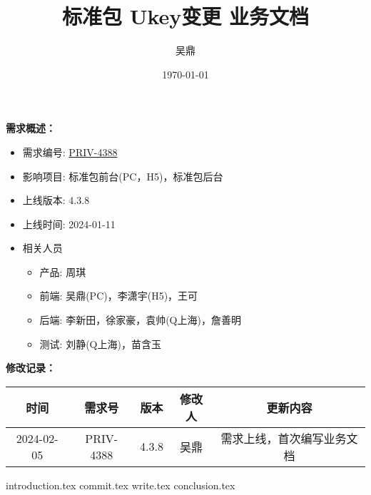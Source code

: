 \documentclass{../../latex/PionpillNote-article}
\title{\textbf{标准包 Ukey变更 业务文档}}
\author{
    吴鼎
}
\date{\today}
\begin{document}
\pagestyle{plain}
\maketitle

\noindent\textbf{需求概述：}

\begin{itemize}
    \item 需求编号: \href{https://jira.qiyuesuo.me/browse/PRIV-4388?goToView=1}{PRIV-4388}
    \item 影响项目: 标准包前台(PC，H5)，标准包后台
    \item 上线版本: 4.3.8
    \item 上线时间: 2024-01-11
    \item 相关人员
    \begin{itemize}
        \item 产品: 周琪
        \item 前端: 吴鼎(PC)，李潇宇(H5)，王可
        \item 后端: 李新田，徐家豪，袁帅(Q上海)，詹善明
        \item 测试: 刘静(Q上海)，苗含玉
    \end{itemize}
\end{itemize}

\noindent\textbf{修改记录：}

\begin{table}[H]
  \small
  \centering
  \setlength{\tabcolsep}{4mm}
  \begin{tabular}{c|c|c|c|c}
    \toprule
    \textbf{时间} & \textbf{需求号} & \textbf{版本} & \textbf{修改人} & \textbf{更新内容} \\
    \midrule
    2024-02-05 & PRIV-4388 & 4.3.8 & 吴鼎 & 需求上线，首次编写业务文档 \\
    \bottomrule
  \end{tabular}
\end{table}

\newpage

\tableofcontents

\newpage

\setcounter{page}{1} 
\pagestyle{fancy}

{introduction.tex}
{commit.tex}
{write.tex}
{conclusion.tex}
\end{document}
